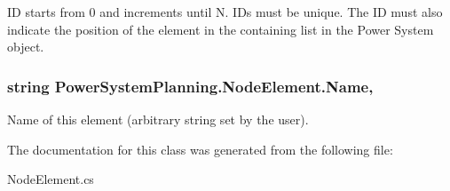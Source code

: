 ID starts from 0 and increments until N. ID\textquotesingle{}s must be unique. The ID must also indicate the position of the element in the containing list in the Power System object. 
\subsubsection[{\texorpdfstring{Name}{Name}}]{\setlength{\rightskip}{0pt plus 5cm}string Power\+System\+Planning.\+Node\+Element.\+Name\hspace{0.3cm}{\ttfamily [get]}, {\ttfamily [set]}}\hypertarget{class_power_system_planning_1_1_node_element_a07a0b254e0ac3b4b97dd45bde0a44291}{}\label{class_power_system_planning_1_1_node_element_a07a0b254e0ac3b4b97dd45bde0a44291}


Name of this element (arbitrary string set by the user). 



The documentation for this class was generated from the following file\+:\begin{DoxyCompactItemize}
\item 
Node\+Element.\+cs\end{DoxyCompactItemize}
